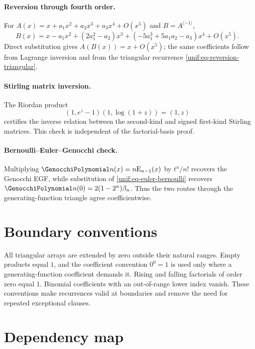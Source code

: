 \documentclass[11pt,a4paper,oneside,openany]{book}
\theoremstyle{definition}
\theoremstyle{remark}
\newcommand{\EulP}[2]{\mathrm E_{#1}(#2)}
\begin{document}
\paragraph{Reversion through fourth order.}
For
$A(x)=x+a_1x^2+a_2x^3+a_3x^4+O(x^5)$ and
$B=A^{\langle-1\rangle}$,
\[
 B(x)=x-a_1x^2+(2a_1^2-a_2)x^3
 +(-5a_1^3+5a_1a_2-a_3)x^4+O(x^5).
\]
Direct substitution gives $A(B(x))=x+O(x^5)$; the same coefficients follow
from Lagrange inversion and from the triangular recurrence
\eqref{unif:eq-reversion-triangular}.

\paragraph{Stirling matrix inversion.}
The Riordan product
\[
 (1,e^z-1)(1,\log(1+z))=(1,z)
\]
certifies the inverse relation between the second-kind and signed first-kind
Stirling matrices. This check is independent of the factorial-basis proof.

\paragraph{Bernoulli--Euler--Genocchi check.}
Multiplying
$\GenocchiPolynomial n(x)=n\EulP{n-1}x$ by $t^n/n!$ recovers the Genocchi EGF, while
substitution of \eqref{unif:eq-euler-bernoulli} recovers
$\GenocchiPolynomial n(0)=2(1-2^n)\beta_n$. Thus the two routes through the generating-function
triangle agree coefficientwise.

\section{Boundary conventions}

All triangular arrays are extended by zero outside their natural ranges.
Empty products equal $1$, and the coefficient convention $0^0=1$ is used only
where a generating-function coefficient demands it. Rising and falling
factorials of order zero equal $1$. Binomial coefficients with an out-of-range
lower index vanish. These conventions make recurrences valid at boundaries and
remove the need for repeated exceptional clauses.

\section{Dependency map}
\end{document}
